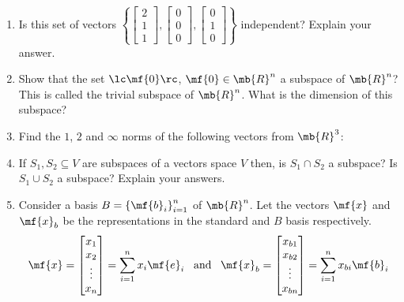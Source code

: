 \begin{enumerate}
    \item Is this set of vectors $\left\{\begin{bmatrix}2 \\ 1 \\ 1\end{bmatrix}, \begin{bmatrix}0 \\ 0\\ 0\end{bmatrix}, \begin{bmatrix}0 \\ 1 \\ 0\end{bmatrix}\right\}$ independent? Explain your answer.
    
    \item Show that the set $\lc \mf{0} \rc$, $\mf{0} \in \mb{R}^n$ a subspace of $\mb{R}^n$? This is called the trivial subspace of $\mb{R}^n$. What is the dimension of this subspace?
    
    \item Find the $1$, $2$ and $\infty$ norms of the following vectors from $\mb{R}^3$:
    

    \item If $S_1, S_2 \subseteq V$ are subspaces of a vectors space $V$ then, is $S_1 \cap S_2$ a subspace? Is $S_1 \cup S_2$ a subspace? Explain your answers.

    \item Consider a basis $B = \left\{\mf{b}_i\right\}_{i=1}^{n}$ of $\mb{R}^n$. Let the vectors $\mf{x}$ and $\mf{x}_b$ be the representations in the standard and $B$ basis respectively. 
    \[ \mf{x} = \begin{bmatrix*}x_1\\x_2\\\vdots\\x_n\end{bmatrix*} = \sum_{i=1}^{n}x_i\mf{e}_i \,\,\,\,\, \text{and} \,\,\,\,\, \mf{x}_b =  \begin{bmatrix*}x_{b1}\\x_{b2}\\\vdots\\x_{bn}\end{bmatrix*} = \sum_{i=1}^{n}x_{bi}\mf{b}_i \]


\end{enumerate}
